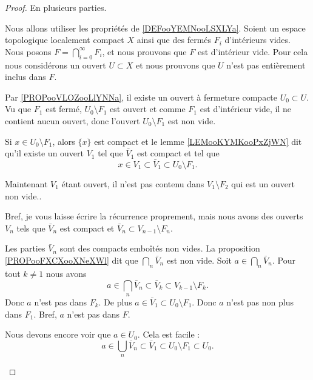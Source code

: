 \begin{proof}
	En plusieurs parties.
	\begin{subproof}
		Nous allons utiliser les propriétés de \ref{DEFooYEMNooLSXLYa}. Soient un espace topologique localement compact \( X\) ainsi que des fermés \( F_i\) d'intérieurs vides. Nous posons \( F=\bigcap_{i=0}^{\infty}F_i\), et nous prouvons que \( F\) est d'intérieur vide. Pour cela nous considérons un ouvert \( U\subset X\) et nous prouvons que \( U\) n'est pas entièrement inclus dans \( F\).

		Par \ref{PROPooVLOZooLlYNNa}, il existe un ouvert à fermeture compacte \( U_0\subset U\). Vu que \( F_1\) est fermé, \( U_0\setminus F_1\) est ouvert et comme \( F_1\) est d'intérieur vide, il ne contient aucun ouvert, donc l'ouvert \( U_0\setminus F_1\) est non vide.

		Si \( x\in U_0\setminus F_1\), alors \( \{ x \}\) est compact et le lemme \ref{LEMooKYMKooPxZjWN} dit qu'il existe un ouvert \( V_1\) tel que \( \bar V_1\) est compact et tel que
		\begin{equation}
			x\in V_1\subset\bar V_1\subset U_0\setminus F_1.
		\end{equation}

		Maintenant \( V_1\) étant ouvert, il n'est pas contenu dans \( V_1\setminus F_2\) qui est un ouvert non vide..

		Bref, je vous laisse écrire la récurrence proprement, mais nous avons des ouverts \( V_n\) tels que \( \bar V_n\) est compact et \( \bar V_n\subset V_{n-1}\setminus F_n\).

		Les parties \( \bar V_n\) sont des compacts emboîtés non vides. La proposition \ref{PROPooFXCXooXNeXWl} dit que \( \bigcap_n\bar V_n\) est non vide. Soit \( a\in\bigcap_n\bar V_n\). Pour tout \( k\neq 1\) nous avons
		\begin{equation}
			a\in\bigcap_n\bar V_n\subset\bar V_k\subset V_{k-1}\setminus F_k.
		\end{equation}
		Donc \( a\) n'est pas dans \( F_k\). De plus \( a\in\bar V_1\subset U_0\setminus F_1\). Donc \( a\) n'est pas non plus dans \( F_1\). Bref, \( a\) n'est pas dans \( F\).

		Nous devons encore voir que \( a\in U_0\). Cela est facile :
		\begin{equation}
			a\in \bigcup_n\bar V_n\subset \bar V_1\subset U_0\setminus F_1\subset U_0.
		\end{equation}


\end{subproof}
\end{proof}

